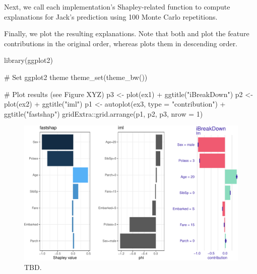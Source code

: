 Next, we call each implementation's Shapley-related function to compute
explanations for Jack's prediction using 100 Monte Carlo repetitions.

\begin{Schunk}
\end{Schunk}

Finally, we plot the resulting explanations. Note that both
 and  plot the feature contributions in
the original order, whereas  plots them in descending order.

\begin{Schunk}
\begin{Sinput}
library(ggplot2)

# Set ggplot2 theme
theme_set(theme_bw())

# Plot results (see Figure XYZ)
p3 <- plot(ex1) + ggtitle("iBreakDown")
p2 <- plot(ex2) + ggtitle("iml")
p1 <- autoplot(ex3, type = "contribution") + ggtitle("fastshap")
gridExtra::grid.arrange(p1, p2, p3, nrow = 1)
\end{Sinput}
\begin{figure}[!htb]

{\centering \includegraphics[width=1\linewidth]{greenwell_files/figure-latex/titanic-jack-explanations-plot-1} 

}

\caption[TBD]{TBD.}\label{fig:titanic-jack-explanations-plot}
\end{figure}
\end{Schunk}

